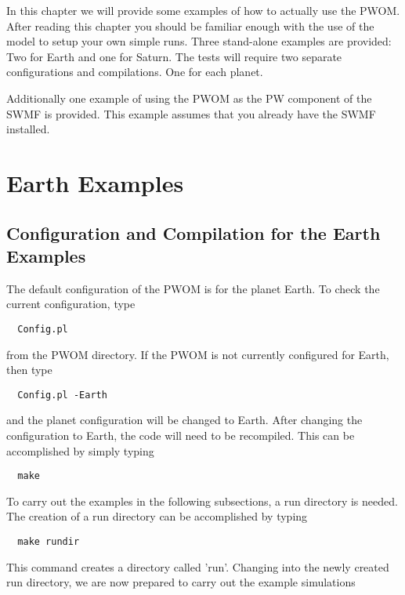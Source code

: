 In this chapter we will provide some examples of how to actually use the 
PWOM. After reading this chapter you should be familiar enough with the 
use of the model to setup your own simple runs. Three stand-alone examples are 
provided: 
Two for Earth and one for Saturn. The tests will require two separate 
configurations and compilations. One for each planet.

Additionally one example of using the PWOM as the PW component of the SWMF 
is provided. This example assumes that you already have the SWMF installed. 
 

\section{Earth Examples}

\subsection{Configuration and Compilation for the Earth Examples}
The default configuration of the PWOM is for the planet Earth. To check the 
current configuration, type
\begin{verbatim}
  Config.pl
\end{verbatim}
from the PWOM directory. If the PWOM is not currently configured for Earth, 
then type
\begin{verbatim}
  Config.pl -Earth
\end{verbatim}
and the planet configuration will be changed to Earth. After changing the 
configuration to Earth, the code will need to be recompiled. This can be 
accomplished by simply typing
\begin{verbatim}
  make
\end{verbatim}
To carry out the examples in the following subsections, a run directory is 
needed. The creation of a run directory can be accomplished by typing
\begin{verbatim}
  make rundir
\end{verbatim}
This command creates a directory called 'run'. Changing into the newly created 
run directory, we are now prepared to carry out the example simulations

